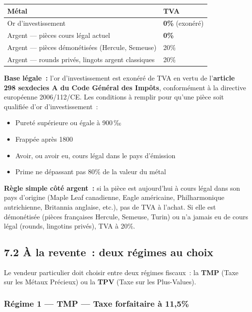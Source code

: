 \documentclass[14pt,a4paper]{extarticle}
\newcommand{\permil}{‰}
\begin{document}
\begin{center}
\begin{tabular}{ll}
\toprule
Métal & TVA \\
\midrule
Or d'investissement & \textbf{0\%} (exonéré) \\
Argent --- pièces cours légal actuel & \textbf{0\%} \\
Argent --- pièces démonétisées (Hercule, Semeuse) & 20\% \\
Argent --- rounds privés, lingots argent classiques & 20\% \\
\bottomrule
\end{tabular}
\end{center}

\textbf{Base légale~:} l'or d'investissement est exonéré de TVA en vertu de l'\textbf{article 298 sexdecies A du Code Général des Impôts}, conformément à la directive européenne 2006/112/CE. Les conditions à remplir pour qu'une pièce soit qualifiée d'or d'investissement~:

\begin{itemize}
  \item Pureté supérieure ou égale à 900\,\permil
  \item Frappée après 1800
  \item Avoir, ou avoir eu, cours légal dans le pays d'émission
  \item Prime ne dépassant pas 80\% de la valeur du métal
\end{itemize}

\textbf{Règle simple côté argent~:} si la pièce est aujourd'hui à cours légal dans son pays d'origine (Maple Leaf canadienne, Eagle américaine, Philharmonique autrichienne, Britannia anglaise, etc.), pas de TVA à l'achat. Si elle est démonétisée (pièces françaises Hercule, Semeuse, Turin) ou n'a jamais eu de cours légal (rounds, lingotins privés), TVA à 20\%.

\subsection{7.2 À la revente~: deux régimes au choix}

Le vendeur particulier doit choisir entre deux régimes fiscaux~: la \textbf{TMP} (Taxe sur les Métaux Précieux) ou la \textbf{TPV} (Taxe sur les Plus-Values).

\subsubsection*{Régime 1 — TMP — Taxe forfaitaire à 11,5\%}
\end{document}
